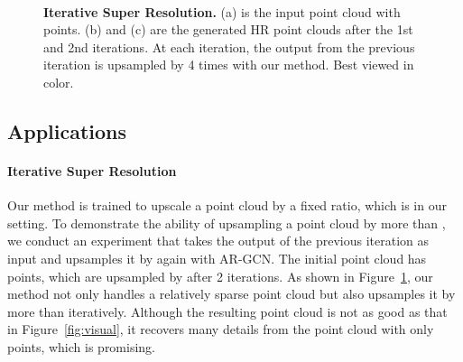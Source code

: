 \documentclass[10pt,twocolumn,letterpaper]{article}
\begin{document}
\begin{figure}
\captionsetup[subfigure]{labelformat=empty}
\begin{center}
    \hfill
	\hfill
	\\
	\hfill
	\hfill
\end{center}
	\vspace{-1.5em}
	\caption{\textbf{Iterative Super Resolution.} (a) is the input point cloud with  points. (b) and (c) are the generated HR point clouds after the 1st and 2nd iterations. At each iteration, the output from the previous iteration is upsampled by 4 times with our method. Best viewed in color.}
	\vspace{-1em}
	\label{fig:iterative}
\end{figure}

\subsection{Applications}
\paragraph{Iterative Super Resolution}
Our method is trained to upscale a point cloud by a fixed ratio, which is  in our setting.
To demonstrate the ability of upsampling a point cloud by more than , we conduct an experiment that takes the output of the previous iteration as input and upsamples it by  again with AR-GCN.
The initial point cloud has  points, which are upsampled by  after 2 iterations.
As shown in Figure~\ref{fig:iterative}, our method not only handles a relatively sparse point cloud but also upsamples it by more than  iteratively.
Although the resulting point cloud is not as good as that in Figure~\ref{fig:visual}, it recovers many details from the point cloud with only  points, which is promising.

\vspace{-1em}
\end{document}
